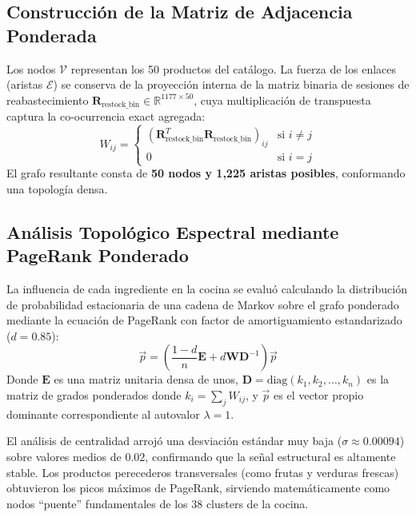 \documentclass[11pt,a4paper]{article}
\begin{document}
\subsection{Construcción de la Matriz de Adjacencia Ponderada}
Los nodos $\mathcal{V}$ representan los 50 productos del catálogo. La fuerza de los enlaces (aristas $\mathcal{E}$) se conserva de la proyección interna de la matriz binaria de sesiones de reabastecimiento $\mathbf{R}_{\text{restock\_bin}} \in \mathbb{R}^{1177 \times 50}$, cuya multiplicación de transpuesta captura la co-ocurrencia exact agregada:
\begin{equation}
W_{ij} = \begin{cases} (\mathbf{R}_{\text{restock\_bin}}^T \mathbf{R}_{\text{restock\_bin}})_{ij} & \text{si } i \neq j \\ 0 & \text{si } i = j \end{cases}
\end{equation}
El grafo resultante consta de \textbf{50 nodos y 1,225 aristas posibles}, conformando una topología densa.

\subsection{Análisis Topológico Espectral mediante PageRank Ponderado}
La influencia de cada ingrediente en la cocina se evaluó calculando la distribución de probabilidad estacionaria de una cadena de Markov sobre el grafo ponderado mediante la ecuación de PageRank con factor de amortiguamiento estandarizado ($d = 0.85$):
\begin{equation}
\vec{p} = \left( \frac{1 - d}{n} \mathbf{E} + d \mathbf{W} \mathbf{D}^{-1} \right) \vec{p}
\end{equation}
Donde $\mathbf{E}$ es una matriz unitaria densa de unos, $\mathbf{D} = \text{diag}(k_1, k_2, \dots, k_n)$ es la matriz de grados ponderados donde $k_i = \sum_{j} W_{ij}$, y $\vec{p}$ es el vector propio dominante correspondiente al autovalor $\lambda = 1$.

El análisis de centralidad arrojó una desviación estándar muy baja ($\sigma \approx 0.00094$) sobre valores medios de $0.02$, confirmando que la señal estructural es altamente stable. Los productos perecederos transversales (como frutas y verduras frescas) obtuvieron los picos máximos de PageRank, sirviendo matemáticamente como nodos ``puente'' fundamentales de los 38 clusters de la cocina.

\end{document}
